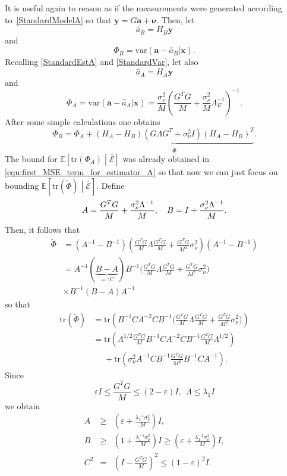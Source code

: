 \documentclass[10pt,twocolumn,twoside]{IEEEtran}					%
\theoremstyle	{plain}
\newcommand{\TraceOf}				[1]	{\mathrm{tr} \left( #1 \right)}
\newcommand{\IDefinedAs}		[0]	{=\mathrel{\mathop:}}
\newcommand{\Expectation}					[0]	{\mathbb{E}}
\newcommand{\ExpectationOf}					[1]	{\Expectation \left[ #1 \right]}
\newcommand{\ExpectationOfGiven}			[2]	{\ExpectationOf{ #1 \; \left| \; #2 \right. }}
\newcommand{\Variance}				[0]	{\mathrm{var}}
\newcommand{\VarianceOf}			[1]	{\Variance \left( #1 \right)}
\begin{document}
It is useful again to reason as if the measurements were generated according to~\eqref{StandardModelA} so that $\bm{y}=G \bm{a} + \bm{\nu}$. Then, let 
$$
\widehat a_B = H_B \bm{y}
$$
and 
$$
\Phi_B= \VarianceOf{\bm{a}-\widehat a_B | \bm{x}}.
$$ 
Recalling \eqref{StandardEstA} and \eqref{StandardVar}, let also
$$
\widehat{a}_A = H_A \bm{y}
$$
and 
$$
\Phi_A= \VarianceOf{\bm{a}-\widehat a_A | \bm{x}}=\frac{\sigma^{2}_{\nu}}{M}
	\left( \frac{G^{T} G}{M} + \frac{\sigma^{2}_{\nu}}{M} \Lambda^{-1}_{E} \right)^{-1}.
$$ 
After some simple calculations one obtains
%
\begin{equation}
\Phi_B = \Phi_A 
	+  \underbrace{(H_A-H_B)(G\Lambda G^T+\sigma_{\nu}^2 I)(H_A-H_B)^T}_{\widetilde{\Phi}}.
\end{equation}
The bound for $\ExpectationOfGiven{\TraceOf{\Phi_A}}{\overline{\mathcal{E}}}$ was already obtained in \eqref{equ:first_MSE_term_for_estimator_A} so that now we can just focus on bounding $\ExpectationOfGiven{\TraceOf{\widetilde{\Phi}}}{\overline{\mathcal{E}}}$. Define
$$
A=\frac{G^TG}{M}+\frac{\sigma_{\nu}^{2}\Lambda^{-1}}{M}, \quad B=I+\frac{\sigma_{\nu}^{2}\Lambda^{-1}}{M}.
\vspace{0.2cm} 
$$
%
Then, it follows that
%
$$
\begin{array}{lll}
	\widetilde{\Phi} \!\!\! &= (A^{-1}-B^{-1}) \left( \frac{G^TG}{M}\Lambda\frac{G^TG}{M} + \frac{G^TG}{M^2}\sigma_{\nu}^2 \right) (A^{-1}-B^{-1}) \\
	&= A^{-1}(\underbrace{B-A}_{\IDefinedAs C})B^{-1} \Big(\frac{G^TG}{M}\Lambda\frac{G^TG}{M} + \frac{G^TG}{M^2}\sigma_{\nu}^2 \Big) \\
	 & \times B^{-1}(B-A)A^{-1} 
\end{array}
$$
so that
\begin{equation}
	\begin{array}{ll}
		\TraceOf{\widetilde{\Phi}} &=
		\TraceOf{B^{-1}CA^{-2}CB^{-1}\Big(\frac{G^TG}{M}\Lambda\frac{G^TG}{M} + \frac{G^TG}{M^2}\sigma_{\nu}^2 \Big)}\\
		&= \TraceOf{\Lambda^{1/2}\frac{G^TG}{M}B^{-1}CA^{-2}CB^{-1} \frac{G^TG}{M}\Lambda^{1/2} }  \\
		&\phantom{=} + \TraceOf{\sigma_{\nu}^2 A^{-1}CB^{-1} \frac{G^TG}{M^2} B^{-1}CA^{-1}}.
\end{array}
\end{equation}
%
Since
%
$$
	\varepsilon I \leq \frac{G^TG}{M}\leq (2-\varepsilon) I, \ \ \Lambda\leq\lambda_1I
$$
%
we obtain
$$
	\begin{array}{lll}
		A &\geq & \left(\varepsilon + \frac{\lambda_1^{-1} \sigma_{\nu}^2}{M} \right)I, \\
		B &\geq & \left(1 + \frac{\lambda_1^{-1} \sigma_{\nu}^2}{M} \right)I \geq  \left(\varepsilon + \frac{\lambda_1^{-1} \sigma_{\nu}^2}{M} \right)I,\\
		C^2 & = & \left(I-\frac{G^TG}{M} \right)^2\leq (1-\varepsilon)^2 I.
	\end{array}
$$
\end{document}

